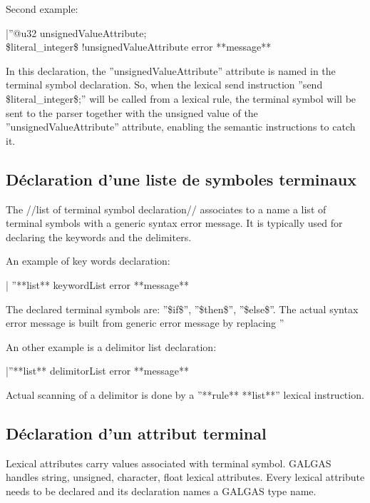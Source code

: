 Second example:

|''@u32 unsignedValueAttribute;\\
\$literal\_integer\$ !unsignedValueAttribute error **message** %

In this declaration, the ''unsignedValueAttribute'' attribute is named in the terminal symbol declaration. So, when the lexical send instruction ''send \$literal\_integer\$;'' will be called from a lexical rule, the terminal symbol will be sent to the parser together with the unsigned value of the ''unsignedValueAttribute'' attribute, enabling the semantic instructions to catch it.

\subsection{Déclaration d'une liste de symboles terminaux}

The //list of terminal symbol declaration// associates to a name a list of terminal symbols with a generic syntax error message. It is typically used for declaring the keywords and the delimiters.

An example of key words declaration:

| ''**list** keywordList error **message** %

The declared terminal symbols are: ''\$if\$'', ''\$then\$'', ''\$else\$''. The actual syntax error message is built from generic error message by replacing ''%

An other example is a delimitor list declaration:

|''**list** delimitorList error **message** %

Actual scanning of a delimitor is done by a ''**rule** **list**'' lexical instruction.

\subsection{Déclaration d'un attribut terminal}

Lexical attributes carry values associated with terminal symbol. GALGAS handles string, unsigned, character, float lexical attributes. Every lexical attribute needs to be declared and its declaration names a GALGAS type name.


